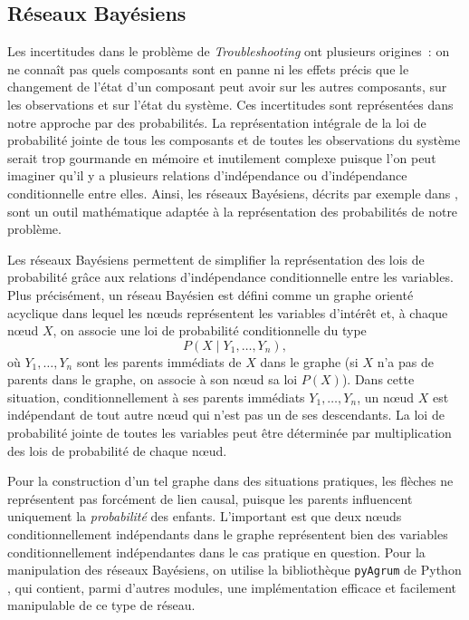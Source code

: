 \documentclass[a4paper,11pt]{article}
\theoremstyle{plain}
\theoremstyle{definition}
\begin{document}

\subsection{Réseaux Bayésiens}
\label{SecReseauxBayesiens}

Les incertitudes dans le problème de \emph{Troubleshooting} ont plusieurs origines~: on ne connaît pas quels composants sont en panne ni les effets précis que le changement de l'état d'un composant peut avoir sur les autres composants, sur les observations et sur l'état du système. Ces incertitudes sont représentées dans notre approche par des probabilités. La représentation intégrale de la loi de probabilité jointe de tous les composants et de toutes les observations du système serait trop gourmande en mémoire et inutilement complexe puisque l'on peut imaginer qu'il y a plusieurs relations d'indépendance ou d'indépendance conditionnelle entre elles. Ainsi, les réseaux Bayésiens, décrits par exemple dans \cite{Jensen_2007}, sont un outil mathématique adaptée à la représentation des probabilités de notre problème.

Les réseaux Bayésiens permettent de simplifier la représentation des lois de probabilité grâce aux relations d'indépendance conditionnelle entre les variables. Plus précisément, un réseau Bayésien est défini comme un graphe orienté acyclique dans lequel les nœuds représentent les variables d'intérêt et, à chaque nœud $X$, on associe une loi de probabilité conditionnelle du type
\[
P(X \mid Y_1, \dotsc, Y_n),
\]
où $Y_1, \dotsc, Y_n$ sont les parents immédiats de $X$ dans le graphe (si $X$ n'a pas de parents dans le graphe, on associe à son nœud sa loi $P(X)$). Dans cette situation, conditionnellement à ses parents immédiats $Y_1, \dotsc, Y_n$, un nœud $X$ est indépendant de tout autre nœud qui n'est pas un de ses descendants. La loi de probabilité jointe de toutes les variables peut être déterminée par multiplication des lois de probabilité de chaque nœud.

Pour la construction d'un tel graphe dans des situations pratiques, les flèches ne représentent pas forcément de lien causal, puisque les parents influencent uniquement la \emph{probabilité} des enfants. L'important est que deux nœuds conditionnellement indépendants dans le graphe représentent bien des variables conditionnellement indépendantes dans le cas pratique en question. Pour la manipulation des réseaux Bayésiens, on utilise la bibliothèque \texttt{pyAgrum} de Python \cite{Gonzales_2017}, qui contient, parmi d'autres modules, une implémentation efficace et facilement manipulable de ce type de réseau.
\end{document}
